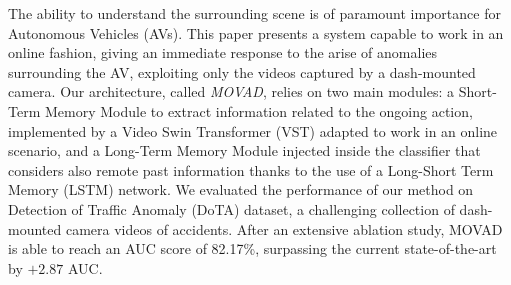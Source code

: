 The ability to understand the surrounding scene is of paramount importance for Autonomous Vehicles (AVs).
This paper presents a system capable to work in an online fashion, giving an immediate response to the arise of anomalies surrounding the AV, exploiting only the videos captured by a dash-mounted camera.
Our architecture, called \emph{MOVAD}, relies on two main modules: a Short-Term Memory Module to extract information related to the ongoing action, implemented by a Video Swin Transformer (VST) adapted to work in an online scenario, and a Long-Term Memory Module injected inside the classifier that considers also remote past information thanks to the use of a Long-Short Term Memory (LSTM) network. 
We evaluated the performance of our method on Detection of Traffic Anomaly (DoTA) dataset, a challenging collection of dash-mounted camera videos of accidents.
After an extensive ablation study, MOVAD is able to reach an AUC score of 82.17\%, surpassing the current state-of-the-art by $+2.87$ AUC.